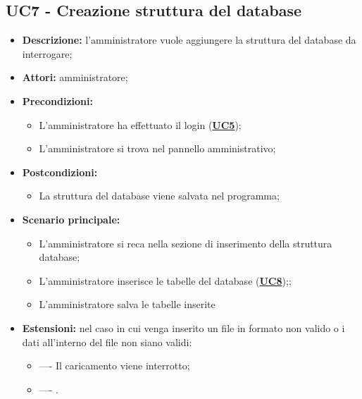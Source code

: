 \documentclass[5pt]{article}
\begin{document}
\subsection{UC7 - Creazione struttura del database}
\label{sec:UC7}
\begin{itemize}
    \item \textbf{Descrizione:} l’amministratore vuole aggiungere la struttura del database da interrogare;
    \item \textbf{Attori:} amministratore;
    \item \textbf{Precondizioni:} 
    \begin{itemize}
        \item L’amministratore ha effettuato il login (\hyperref[sec:UC5]{\textbf{UC5}});
        \item L’amministratore si trova nel pannello amministrativo;
    \end{itemize}
    \item \textbf{Postcondizioni:} 
    \begin{itemize}
        \item La struttura del database viene salvata nel programma;
    \end{itemize}
    \item \textbf{Scenario principale:} 
    \begin{itemize}
        \item L’amministratore si reca nella sezione di inserimento della struttura database;
        \item L'amministratore inserisce le tabelle del database (\hyperref[sec:UC8]{\textbf{UC8}});;
        \item L'amministratore salva le tabelle inserite
    \end{itemize}
    \item \textbf{Estensioni:} nel caso in cui venga inserito un file in formato non valido o i dati all’interno del file non siano validi:
    \begin{itemize}
        \item ---- Il caricamento viene interrotto;
        \item ---- .
    \end{itemize}
\end{itemize}
\end{document}
